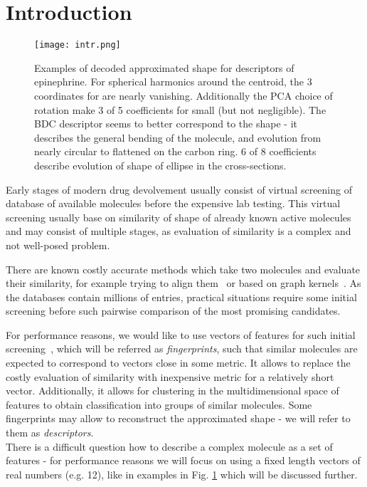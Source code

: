 \documentclass[10pt,journal]{IEEEtranTCOM}
\theoremstyle{plain}
\begin{document}
\section{Introduction}
\begin{figure}[t!]
    \centering
        \texttt{[image: intr.png]}
        \caption{Examples of decoded approximated shape for descriptors of epinephrine. For spherical harmonics around the centroid, the 3 coordinates for  are nearly vanishing. Additionally the PCA choice of rotation make 3 of 5 coefficients for  small (but not negligible). The BDC descriptor seems to better correspond to the shape - it describes the general bending of the molecule, and evolution from nearly circular to flattened on the carbon ring. 6 of 8 coefficients describe evolution of shape of ellipse in the cross-sections. }
        \label{intr}
\end{figure}
Early stages of modern drug devolvement usually consist of virtual screening of database of available molecules before the expensive lab testing. This virtual screening usually base on similarity of shape of already known active molecules and may consist of multiple stages, as evaluation of similarity is a complex and not well-posed problem.

There are known costly accurate methods which take two molecules and evaluate their similarity, for example trying to align them~\cite{align} or based on graph kernels~\cite{kernel}. As the databases contain millions of entries, practical situations require some initial screening before such pairwise comparison of the most promising candidates.

For performance reasons, we would like to use vectors of features for such initial screening~\cite{finger}, which will be referred as \emph{fingerprints}, such that similar molecules are expected to correspond to vectors close in some metric. It allows to replace the costly evaluation of similarity with inexpensive metric for a relatively short vector. Additionally, it allows for clustering in the multidimensional space of features to obtain classification into groups of similar molecules. Some fingerprints may allow to reconstruct the approximated shape - we will refer to them as \emph{descriptors}. \\

There is a difficult question how to describe a complex molecule as a set of features - for performance reasons we will focus on using a fixed length vectors of real numbers (e.g. 12), like in examples in Fig. \ref{intr} which will be discussed further.
\end{document}
